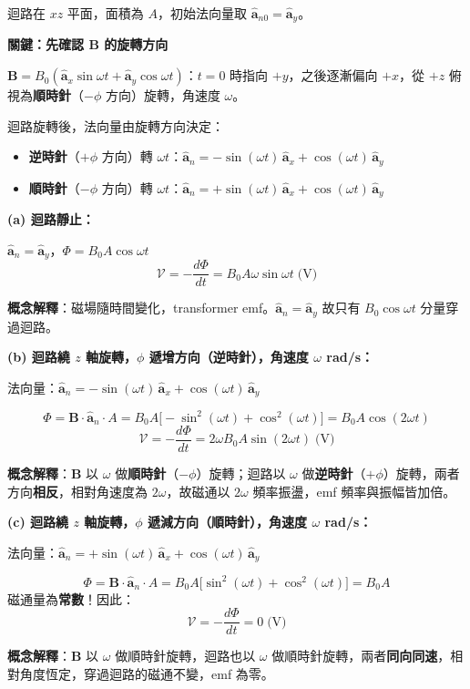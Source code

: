 \documentclass[12pt,a4paper]{article}
\newcommand{\vB}{\mathbf{B}}
\newcommand{\ax}{\hat{\mathbf{a}}_x}
\newcommand{\ay}{\hat{\mathbf{a}}_y}
\newcommand{\an}{\hat{\mathbf{a}}_n}
\newcommand{\emf}{\mathcal{V}}
\begin{document}
\begin{solutionbox}[詳解]

迴路在 $xz$ 平面，面積為 $A$，初始法向量取 $\hat{\mathbf{a}}_{n0} = \ay$。

\textbf{關鍵：先確認 $\vB$ 的旋轉方向}

$\vB = B_0(\ax\sin\omega t + \ay\cos\omega t)$：$t=0$ 時指向 $+y$，之後逐漸偏向 $+x$，從 $+z$ 俯視為\textbf{順時針}（$-\phi$ 方向）旋轉，角速度 $\omega$。

迴路旋轉後，法向量由旋轉方向決定：
\begin{itemize}
  \item \textbf{逆時針}（$+\phi$ 方向）轉 $\omega t$：$\displaystyle\an = -\sin(\omega t)\,\ax + \cos(\omega t)\,\ay$
  \item \textbf{順時針}（$-\phi$ 方向）轉 $\omega t$：$\displaystyle\an = +\sin(\omega t)\,\ax + \cos(\omega t)\,\ay$
\end{itemize}

\textbf{(a) 迴路靜止：}

$\an = \ay$，$\Phi = B_0 A\cos\omega t$
\[
  \boxed{\emf = -\frac{d\Phi}{dt} = B_0 A \omega \sin\omega t \;\text{(V)}}
\]

\textbf{概念解釋}：磁場隨時間變化，transformer emf。$\an = \ay$ 故只有 $B_0\cos\omega t$ 分量穿過迴路。

\bigskip
\textbf{(b) 迴路繞 $z$ 軸旋轉，$\phi$ 遞增方向（逆時針），角速度 $\omega$ rad/s：}

法向量：$\an = -\sin(\omega t)\,\ax + \cos(\omega t)\,\ay$

\[
  \Phi = \vB\cdot\an\cdot A = B_0 A\bigl[-\sin^2(\omega t) + \cos^2(\omega t)\bigr] = B_0 A\cos(2\omega t)
\]
\[
  \boxed{\emf = -\frac{d\Phi}{dt} = 2\omega B_0 A \sin(2\omega t) \;\text{(V)}}
\]

\textbf{概念解釋}：$\vB$ 以 $\omega$ 做\textbf{順時針}（$-\phi$）旋轉；迴路以 $\omega$ 做\textbf{逆時針}（$+\phi$）旋轉，兩者方向\textbf{相反}，相對角速度為 $2\omega$，故磁通以 $2\omega$ 頻率振盪，emf 頻率與振幅皆加倍。

\bigskip
\textbf{(c) 迴路繞 $z$ 軸旋轉，$\phi$ 遞減方向（順時針），角速度 $\omega$ rad/s：}

法向量：$\an = +\sin(\omega t)\,\ax + \cos(\omega t)\,\ay$

\[
  \Phi = \vB\cdot\an\cdot A = B_0 A\bigl[\sin^2(\omega t) + \cos^2(\omega t)\bigr] = B_0 A
\]
磁通量為\textbf{常數}！因此：
\[
  \boxed{\emf = -\frac{d\Phi}{dt} = 0 \;\text{(V)}}
\]

\textbf{概念解釋}：$\vB$ 以 $\omega$ 做順時針旋轉，迴路也以 $\omega$ 做順時針旋轉，兩者\textbf{同向同速}，相對角度恆定，穿過迴路的磁通不變，emf 為零。
\end{solutionbox}
\end{document}
